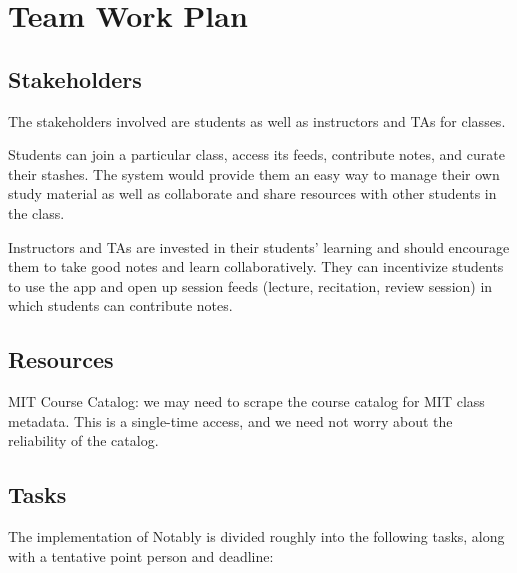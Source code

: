 \documentclass{article}
\begin{document}
\newpage
\section*{Team Work Plan}
\subsection*{Stakeholders}
The stakeholders involved are students as well as instructors and TAs for classes.

Students can join a particular class, access its feeds, contribute notes, and curate their stashes. The system would provide them an easy way to manage their own study material as well as collaborate and share resources with other students in the class.

Instructors and TAs are invested in their students' learning and should encourage them to take good notes and learn collaboratively. They can incentivize students to use the app and open up session feeds (lecture, recitation, review session) in which students can contribute notes.

\subsection*{Resources}
MIT Course Catalog: we may need to scrape the course catalog for MIT class metadata. This is a single-time access, and we need not worry about the reliability of the catalog.

\subsection*{Tasks}
The implementation of Notably is divided roughly into the following tasks, along with a tentative point person and deadline:
\end{document}

